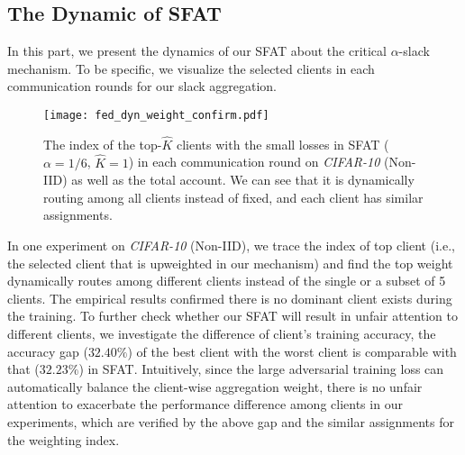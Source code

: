 \documentclass{article} %
\theoremstyle{plain}
\theoremstyle{definition}
\theoremstyle{remark}
\begin{document}


\subsection{The Dynamic of SFAT}
\label{app:tracing}

In this part, we present the dynamics of our SFAT about the critical $\alpha$-slack mechanism. To be specific, we visualize the selected clients in each communication rounds for our slack aggregation.

\vspace{4mm}
\begin{figure}[htp]
    \centering
    \texttt{[image: fed\_dyn\_weight\_confirm.pdf]}
    \caption{The index of the top-$\widehat{K}$ clients with the small losses in SFAT ($\alpha=1/6$, $\widehat{K}=1$) in each  communication round on \textit{CIFAR-10} (Non-IID) as well as the total account. We can see that it is dynamically routing among all clients instead of fixed, and each client has similar assignments.}
    \label{fig:dyn_tracing_app}
\end{figure}
\vspace{2mm}



In one experiment on \textit{CIFAR-10} (Non-IID), we trace the index of top client (i.e., the selected client that is upweighted in our mechanism) and find the top weight dynamically routes among different clients instead of the single or a subset of 5 clients. The empirical results confirmed there is no dominant client exists during the training. To further check whether our SFAT will result in unfair attention to different clients, we investigate the difference of client's training accuracy, the accuracy gap ($32.40\%$) of the best client with the worst client is comparable with that ($32.23\%$) in SFAT. Intuitively, since the large adversarial training loss can automatically balance the client-wise aggregation weight, there is no unfair attention to exacerbate the performance difference among clients in our experiments, which are verified by the above gap and the similar assignments for the weighting index.  
\end{document}
